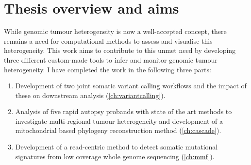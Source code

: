 \section{Thesis overview and aims}
\label{intro-sec:overview}

While genomic tumour heterogeneity is now a well-accepted concept, there remains a need for computational methods to assess and visualise this heterogeneity. This work aims to contribute to this unmet need by developing three different custom-made tools to infer and monitor genomic tumour heterogeneity. I have completed the work in the following three parts:

\begin{enumerate}
	\item Development of two joint somatic variant calling workflows and the impact of these on downstream analysis (\autoref{ch:variantcalling}). 
	\item Analysis of five rapid autopsy probands with state of the art methods to investigate multi-regional tumour heterogeneity and development of a mitochondrial based phylogeny reconstruction method (\autoref{ch:cascade}). 
	\item Development of a read-centric method to detect somatic mutational signatures from low coverage whole genome sequencing (\autoref{ch:mmf}).
\end{enumerate}